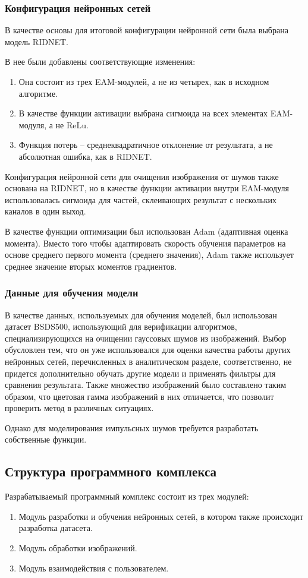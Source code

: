 \subsubsection{Конфигурация нейронных сетей}
В качестве основы для итоговой конфигурации нейронной сети была выбрана модель RIDNET.

В нее были добавлены соответствующие изменения:
\begin{enumerate}
	\item Она состоит из трех EAM-модулей, а не из четырех, как в исходном алгоритме.
	\item В качестве функции активации выбрана сигмоида на всех элементах EAM-модуля, а не ReLu.
	\item Функция потерь -- среднеквадратичное отклонение от результата, а не абсолютная ошибка, как в RIDNET.
\end{enumerate}

Конфигурация нейронной сети для очищения изображения от шумов также основана на RIDNET, но в качестве функции активации внутри EAM-модуля использовалась сигмоида для частей, склеивающих результат с нескольких каналов в один выход.

В качестве функции оптимизации был использован Adam (адаптивная оценка момента).
Вместо того чтобы адаптировать скорость обучения параметров на основе среднего первого момента (среднего значения), Adam также использует среднее значение вторых моментов градиентов.

\subsubsection{Данные для обучения модели}
В качестве данных, используемых для обучения моделей, был использован датасет BSDS500, использующий для верификации алгоритмов, специализирующихся на очищении гауссовых шумов из изображений.
Выбор обусловлен тем, что он уже использовался для оценки качества работы других нейронных сетей, перечисленных в аналитическом разделе, соответственно, не придется дополнительно обучать другие модели и применять фильтры для сравнения результата.
Также множество изображений было составлено таким образом, что цветовая гамма изображений в них отличается, что позволит проверить метод в различных ситуациях.

Однако для моделирования импульсных шумов требуется разработать собственные функции.

\subsection{Структура программного комплекса}
Разрабатываемый программный комплекс состоит из трех модулей:
\begin{enumerate}
	\item Модуль разработки и обучения нейронных сетей, в котором также происходит разработка датасета.
	\item Модуль обработки изображений.
	\item Модуль взаимодействия с пользователем.
\end{enumerate}

